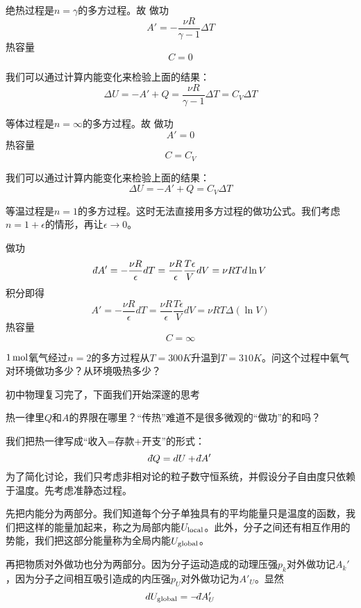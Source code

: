 \documentclass[CJK]{beamer}
\begin{document}
\begin{frame}
\bch
\bex
绝热过程是$n=\gamma$的多方过程。故
做功
$$A' = -\frac{\nu R}{\gamma-1}\Delta T$$
热容量
$$C = 0 $$

我们可以通过计算内能变化来检验上面的结果：
$$ \Delta U = -A' + Q = \frac{\nu R}{\gamma-1} \Delta T  =  C_V\Delta T$$

\eex
\ech
\end{frame}

\begin{frame}
\bch
\bex
等体过程是$n=\infty$的多方过程。故
做功
$$A' = 0$$
热容量
$$C = C_V $$

我们可以通过计算内能变化来检验上面的结果：
$$ \Delta U = -A' + Q =  C_V\Delta T$$

\eex
\ech
\end{frame}


\begin{frame}
\bch
\bex
等温过程是$n=1$的多方过程。这时无法直接用多方过程的做功公式。我们考虑$n=1+\epsilon$的情形，再让$\epsilon \rightarrow 0$。

做功
$$\dbar A' = -\frac{\nu R}{\epsilon}dT = \frac{\nu R}{\epsilon}\frac{T\epsilon}{V}dV = \nu RT d\ln V $$
积分即得
$$ A' = -\frac{\nu R}{\epsilon}dT = \frac{\nu R}{\epsilon}\frac{T\epsilon}{V}dV = \nu RT \Delta(\ln V) $$
热容量
$$C = \infty $$

\eex
\ech
\end{frame}


\begin{frame}
\bch
{}
$1\,\mathrm{mol}$氧气经过$n=2$的多方过程从$T=300K$升温到$T=310K$。问这个过程中氧气对环境做功多少？从环境吸热多少？
\ech
\end{frame}


\begin{frame}
\bch
初中物理复习完了，下面我们开始深邃的思考


热一律里$Q$和$A$的界限在哪里？“传热”难道不是很多微观的“做功”的和吗？

\ech
\end{frame}


\begin{frame}
\bch
我们把热一律写成“收入=存款+开支”的形式：
$$ \dbar Q =  d U + \dbar A'$$
为了简化讨论，我们只考虑非相对论的粒子数守恒系统，并假设分子自由度只依赖于温度。先考虑准静态过程。

\skipline

先把内能分为两部分。我们知道每个分子单独具有的平均能量只是温度的函数，我们把这样的能量加起来，称之为{\blue 局部内能$U_{\rm local}$}。此外，分子之间还有相互作用的势能，我们把这部分能量称为{\blue 全局内能$U_{\rm global}$}。


再把物质对外做功也分为两部分。因为分子运动造成的{\blue 动理压强$p_k$对外做功记$ A_k'$}，因为分子之间相互吸引造成的{\blue 内压强$p_U$对外做功记为$ A'_U$}。显然
{\blue
$$ d U_{\rm global} = - \dbar A'_U$$
}
\ech
\end{frame}
\end{document}

